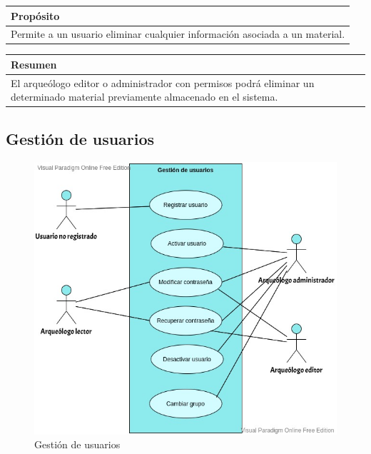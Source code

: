     \begin{table}[H]
        \centering
        \begin{tabularx}{\textwidth}{@{} |L |@{}} \hline
            \textbf{Propósito} \\
            \hline
            Permite a un usuario eliminar cualquier información asociada a un material. \\
            \hline
        \end{tabularx}
    \end{table}

    \begin{table}[H]
        \centering
        \begin{tabularx}{\textwidth}{@{} |L |@{}} \hline
            \textbf{Resumen} \\
            \hline
            El arqueólogo editor o administrador con permisos podrá eliminar un determinado
            material previamente almacenado en el sistema. \\
            \hline
        \end{tabularx}
    \end{table}

\subsection{Gestión de usuarios}
    \begin{figure}[H]
        \centering
        \includegraphics[scale=0.45]{imagenes/diagramas CU/user-UC.jpeg}
        \caption{Gestión de usuarios}
        \label{fig:user-management}
    \end{figure}

